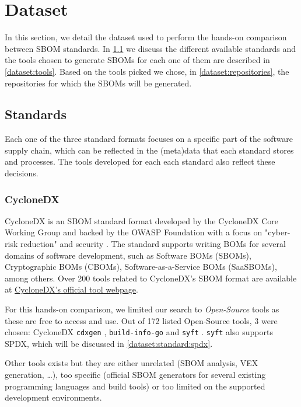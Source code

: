 \section{Dataset}

In this section, we detail the dataset used to perform the hands-on comparison between SBOM standards. In \ref{dataset:standards} we discuss the different available standards and the tools chosen to generate SBOMs for each one of them are described in \ref{dataset:tools}. Based on the tools picked we chose, in \ref{dataset:repositories}, the repositories for which the SBOMs will be generated.

\subsection{Standards} \label{dataset:standards}

Each one of the three standard formats focuses on a specific part of the software supply chain, which can be reflected in the (meta)data that each standard stores and processes. The tools developed for each each standard also reflect these decisions.

\subsubsection{CycloneDX} \label{dataset:standard:cdx}

CycloneDX \cite{standards:sbom:cyclonedx} is an SBOM standard format developed by the CycloneDX Core Working Group and backed by the OWASP Foundation with a focus on "cyber-risk reduction" \cite{standards:sbom:cyclonedx} and security \cite{article:sbom-study}. The standard supports writing BOMs for several domains of software development, such as Software BOMs (SBOMs), Cryptographic BOMs (CBOMs), Software-as-a-Service BOMs (SaaSBOMs), among others. Over 200 tools related to CycloneDX's SBOM format are available at \href{https://cyclonedx.org/tool-center/}{CycloneDX's official tool webpage}.

For this hands-on comparison, we limited our search to \emph{Open-Source} tools as these are free to access and use. Out of 172 listed Open-Source tools, 3 were chosen: CycloneDX \verb|cdxgen| \cite{repository:cyclonedx:cdxgen}, \verb|build-info-go| \cite{repository:cyclonedx:build-info-go} and \verb|syft| \cite{repository:cyclonedx:syft}. \verb|syft| also supports SPDX, which will be discussed in \ref{dataset:standard:spdx}.

Other tools exists but they are either unrelated (SBOM analysis, VEX generation, \dots), too specific (official SBOM generators for several existing programming languages and build tools) or too limited on the supported development environments.

